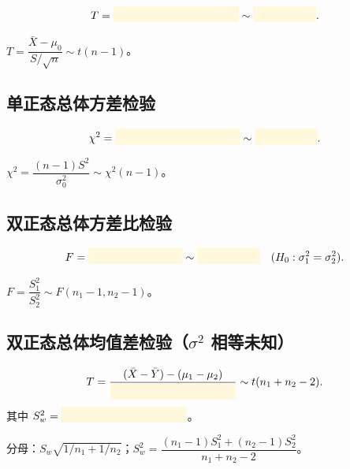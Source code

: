 \documentclass[11pt,a4paper]{article}
\newcommand{\blankbox}[1]{%
  \textcolor{blankyellow}{\rule[-0.1cm]{#1}{0.5cm}}%
}
\begin{document}
\begin{formulabox}[$\sigma^2$ 未知 — $t$ 检验]
\[T = \blankbox{4cm} \sim \blankbox{2cm}.\]
\end{formulabox}

\begin{answerbox}
$T=\dfrac{\bar X-\mu_0}{S/\sqrt n}\sim t(n-1)$。
\end{answerbox}

\subsection{单正态总体方差检验}

\begin{formulabox}[$\chi^2$ 检验]
\[\chi^2 = \blankbox{4cm} \sim \blankbox{2cm}.\]
\end{formulabox}

\begin{answerbox}
$\chi^2=\dfrac{(n-1)S^2}{\sigma_0^2}\sim\chi^2(n-1)$。
\end{answerbox}

\subsection{双正态总体方差比检验}

\begin{formulabox}[$F$ 检验]
\[F = \blankbox{3cm} \sim \blankbox{2cm} \quad (H_0:\sigma_1^2=\sigma_2^2).\]
\end{formulabox}

\begin{answerbox}
$F=\dfrac{S_1^2}{S_2^2}\sim F(n_1-1,n_2-1)$。
\end{answerbox}

\subsection{双正态总体均值差检验（$\sigma^2$ 相等未知）}

\begin{formulabox}[ pooled $t$ 检验]
\[T = \frac{(\bar X-\bar Y)-(\mu_1-\mu_2)}{\blankbox{4cm}} \sim t(n_1+n_2-2).\]
其中 $S_w^2=\blankbox{4cm}$。
\end{formulabox}

\begin{answerbox}
分母：$S_w\sqrt{1/n_1+1/n_2}$；$S_w^2=\dfrac{(n_1-1)S_1^2+(n_2-1)S_2^2}{n_1+n_2-2}$。
\end{answerbox}

\end{document}
